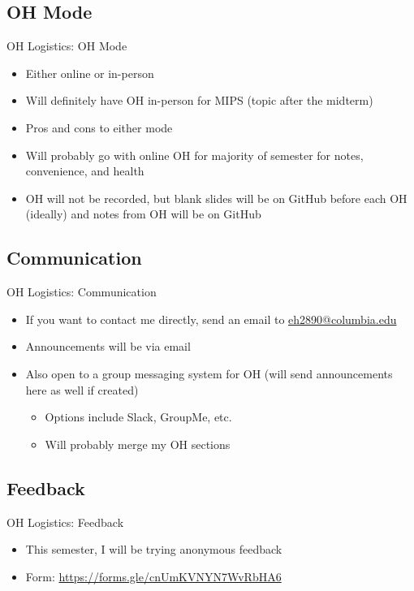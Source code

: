 \documentclass{../slides}
\begin{document}
\subsection{OH Mode}
\begin{frame}{OH Logistics: OH Mode}
    \begin{itemize}
        \item Either online or in-person
        \item Will definitely have OH in-person for MIPS (topic after the midterm)
        \item Pros and cons to either mode
        \item Will probably go with online OH for majority of semester for notes, convenience, and health
        \item OH will not be recorded, but blank slides will be on GitHub before each OH (ideally) and notes from OH will be on GitHub
    \end{itemize}
\end{frame}

\subsection{Communication}
\begin{frame}{OH Logistics: Communication}
    \begin{itemize}
        \item If you want to contact me directly, send an email to \href{mailto:eh2890@columbia.edu}{eh2890@columbia.edu}
        \item Announcements will be via email
        \item Also open to a group messaging system for OH (will send announcements here as well if created)
        \begin{itemize}
            \item Options include Slack, GroupMe, etc.
            \item Will probably merge my OH sections
        \end{itemize}
    \end{itemize}
\end{frame}

\subsection{Feedback}
\begin{frame}{OH Logistics: Feedback}
    \begin{itemize}
        \item This semester, I will be trying anonymous feedback
        \item Form: \url{https://forms.gle/cnUmKVNYN7WvRbHA6}
    \end{itemize}
\end{frame}
\end{document}
